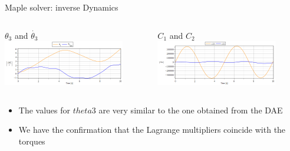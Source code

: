 \documentclass{beamer}              %
\begin{document}
	\begin{frame}{Maple solver: inverse Dynamics}
		\begin{columns}
			\begin{column}{0.5\textwidth}
				\begin{block}{\small \centering $\theta_3$ and $\dot{\theta_3}$}
					\includegraphics[width=150pt]{grafici/inverseDynamicsTheta.png}
				\end{block}
			\end{column}
		    \begin{column}{0.5\textwidth}
		     	\begin{block}{\small \centering $C_1$ and $C_2$}
		    		\includegraphics[width=150pt]{grafici/inverseDynamicsC.png}
		    	\end{block}
		    \end{column}
		\end{columns}
	
		\bigskip
		
		\begin{itemize}
			\item The values for $theta3$ are very similar to the  one obtained from the DAE
			\item We have the confirmation that the Lagrange multipliers coincide with the torques
		\end{itemize}    
	\end{frame}
\end{document}
